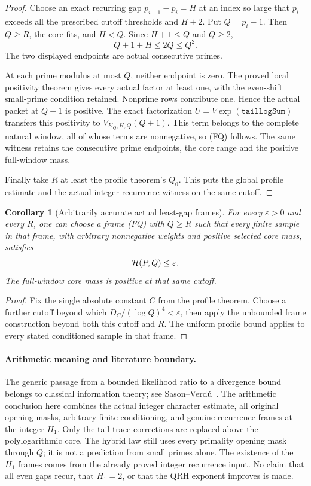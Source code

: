 \documentclass[11pt]{article}
\newtheorem{corollary}[theorem]{Corollary}
\begin{document}
\begin{proof}
Choose an exact recurring gap \(p_{i+1}-p_i=H\) at an index so
large that \(p_i\) exceeds all the prescribed cutoff thresholds
and \(H+2\). Put \(Q=p_i-1\). Then \(Q\geq R\), the core fits,
and \(H<Q\). Since \(H+1\leq Q\) and \(Q\geq2\),
\[
                         Q+1+H\leq2Q\leq Q^2.
\]
The two displayed endpoints are actual consecutive primes.

At each prime modulus at most \(Q\), neither endpoint is zero.
The proved local positivity theorem gives every actual factor
at least one, with the even-shift small-prime condition retained.
Nonprime rows contribute one. Hence the actual packet at \(Q+1\)
is positive. The exact factorization
\(U=V\exp(\texttt{tailLogSum})\) transfers this positivity to
\(V_{K_Q,H,Q}(Q+1)\). This term belongs to the complete natural
window, all of whose terms are nonnegative, so (FQ) follows.
The same witness retains the consecutive prime endpoints, the
core range and the positive full-window mass.

Finally take \(R\) at least the profile theorem's \(Q_0\).
This puts the global profile estimate and the actual integer
recurrence witness on the same cutoff.
\end{proof}

\begin{corollary}[Arbitrarily accurate actual least-gap frames]
\label{cor:accurate-least-gap-frames}
For every \(\varepsilon>0\) and every \(R\), one can choose a frame
(FQ) with \(Q\geq R\) such that every finite sample in that frame,
with arbitrary nonnegative weights and positive selected core mass,
satisfies
\[
                              {\cal H}(P,Q)\leq\varepsilon.
\]
The full-window core mass is positive at that same cutoff.
\end{corollary}
\begin{proof}
Fix the single absolute constant \(C\) from the profile theorem.
Choose a further cutoff beyond which
\(D_C/(\log Q)^4<\varepsilon\), then apply the unbounded frame
construction beyond both this cutoff and \(R\).
The uniform profile bound applies to every stated conditioned
sample in that frame.
\end{proof}

\paragraph{Arithmetic meaning and literature boundary.}
The generic passage from a bounded likelihood ratio to a divergence
bound belongs to classical information theory; see
Sason--Verd\'u~\cite{SasonVerduFdivergence}. The arithmetic conclusion
here combines the actual integer character estimate, all original
opening masks, arbitrary finite conditioning, and genuine recurrence
frames at the integer \(H_1\).
Only the tail trace corrections are replaced above the
polylogarithmic core. The hybrid law still uses every primality
opening mask through \(Q\); it is not a prediction from small primes
alone. The existence of the \(H_1\) frames comes from the already
proved integer recurrence input. No claim that all even gaps recur,
that \(H_1=2\), or that the QRH exponent improves is made.
\end{document}
